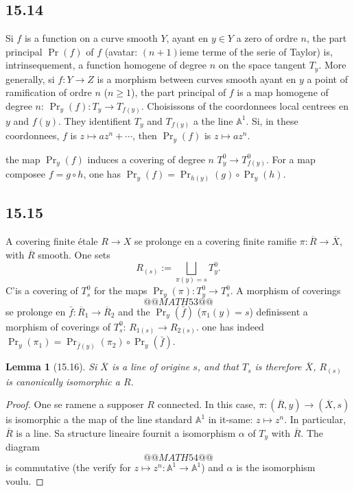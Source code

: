 \documentclass[12pt,a4paper]{article}
\theoremstyle{plain}
\newtheorem{lemma}[theorem]{Lemma}
\theoremstyle{definition}
\theoremstyle{remark}
\newcommand{\bA}{\mathbb{A}}
\begin{document}
\subsection*{15.14}

Si $f$ is a function on a curve smooth $Y$, ayant en $y \in Y$ a zero of ordre $n$, the part principal $\Pr(f)$ of $f$ (avatar: $(n+1)$ieme terme of the serie of Taylor) is, intrinsequement, a function homogene of degree $n$ on the space tangent $T_y$. More generally, si $f: Y \to Z$ is a morphism between curves smooth ayant en $y$ a point of ramification of ordre $n$ ($n \geqslant 1$), the part principal of $f$ is a map homogene of degree $n$: $\Pr_y(f) : T_y \to T_{f(y)}$. Choisissons of the coordonnees local centrees en $y$ and $f(y)$. They identifient $T_y$ and $T_{f(y)}$ a the line $\bA^1$. Si, in these coordonnees, $f$ is $z \mapsto az^n + \cdots$, then $\Pr_y(f)$ is $z \mapsto az^n$.

the map $\Pr_y(f)$ induces a covering of degree $n$ $T_y^0 \to T_{f(y)}^0$. For a map composee $f = g \circ h$, one has $\Pr_y(f) = \Pr_{h(y)}(g) \circ \Pr_y(h)$.

\subsection*{15.15}

A covering finite étale $R \to X$ se prolonge en a covering finite ramifie $\pi : \overline{R} \to \overline{X}$, with $\overline{R}$ smooth. One sets
\[
R_{(s)} := \bigsqcup_{\pi(y) = s} T_y^0.
\]
C'is a covering of $T_s^0$ for the maps $\Pr_y(\pi) : T_y^0 \to T_s^0$. A morphism of coverings
\[
@@MATH53@@
\]
se prolonge en $\bar{f} : \overline{R}_1 \to \overline{R}_2$ and the $\Pr_y(\bar{f})$ ($\pi_1(y) = s$) definissent a morphism of coverings of $T_s^0$: $R_{1(s)} \to R_{2(s)}$. one has indeed $\Pr_y(\pi_1) = \Pr_{\bar{f}(y)}(\pi_2) \circ \Pr_y(\bar{f})$.

\begin{lemma}[15.16]
Si $\overline{X}$ is a line of origine $s$, and that $T_s$ is therefore $\overline{X}$, $R_{(s)}$ is canonically isomorphic a $R$.
\end{lemma}

\begin{proof}
One se ramene a supposer $R$ connected. In this case, $\pi : (\overline{R}, y) \to (\overline{X}, s)$ is isomorphic a the map of the line standard $\bA^1$ in it-same: $z \mapsto z^n$. In particular, $\overline{R}$ is a line. Sa structure lineaire fournit a isomorphism $\alpha$ of $T_y$ with $\overline{R}$. The diagram
\[
@@MATH54@@
\]
is commutative (the verify for $z \mapsto z^n: \bA^1 \to \bA^1$) and $\alpha$ is the isomorphism voulu.
\end{proof}
\end{document}
